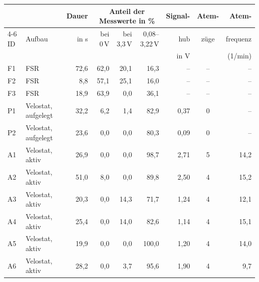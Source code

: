 \begin{tabular}{@{}l l r r r r r c r@{}}
  \toprule
  & & Dauer & \multicolumn{3}{c}{Anteil der Messwerte in \%} & Signal- & Atem- & Atem- \\
  \cmidrule(lr){4-6}
  ID & Aufbau & in s & bei 0\,V & bei 3{,}3\,V & 0{,}08--3{,}22\,V & hub & züge & frequenz \\
  & & & & & & in V & & (1/min) \\
  \midrule
  F1 & \acs{FSR} & 72{,}6 & 62{,}0 & 20{,}1 & 16{,}3 & -- & -- & -- \\
  F2 & \acs{FSR} & 8{,}8 & 57{,}1 & 25{,}1 & 16{,}0 & -- & -- & -- \\
  F3 & \acs{FSR} & 18{,}9 & 63{,}9 & 0{,}0 & 36{,}1 & -- & -- & -- \\
  \addlinespace
  P1 & Velostat, aufgelegt & 32{,}2 & 6{,}2 & 1{,}4 & 82{,}9 & 0{,}37 & 0 & -- \\
  P2 & Velostat, aufgelegt & 23{,}6 & 0{,}0 & 0{,}0 & 80{,}3 & 0{,}09 & 0 & -- \\
  \addlinespace
  A1 & Velostat, aktiv & 26{,}9 & 0{,}0 & 0{,}0 & 98{,}7 & 2{,}71 & 5 & 14{,}2 \\
  A2 & Velostat, aktiv & 51{,}0 & 8{,}0 & 0{,}0 & 89{,}8 & 2{,}50 & 4 & 15{,}2 \\
  A3 & Velostat, aktiv & 20{,}3 & 0{,}0 & 14{,}3 & 71{,}7 & 1{,}24 & 4 & 12{,}1 \\
  A4 & Velostat, aktiv & 25{,}4 & 0{,}0 & 14{,}0 & 82{,}6 & 1{,}14 & 4 & 15{,}1 \\
  A5 & Velostat, aktiv & 19{,}9 & 0{,}0 & 0{,}0 & 100{,}0 & 1{,}20 & 4 & 14{,}0 \\
  A6 & Velostat, aktiv & 28{,}2 & 0{,}0 & 3{,}7 & 95{,}6 & 1{,}90 & 4 & 9{,}7 \\
  \bottomrule
\end{tabular}
